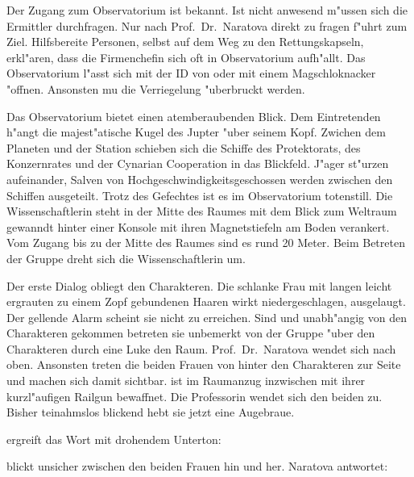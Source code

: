 Der Zugang zum Observatorium ist \ml{} bekannt. Ist \ml{} nicht anwesend m"ussen sich die Ermittler durchfragen. Nur nach Prof.~Dr.~Naratova direkt zu fragen f"uhrt zum Ziel. Hilfsbereite Personen, selbst auf dem Weg zu den Rettungskapseln, erkl"aren, dass die Firmenchefin sich oft in  Observatorium aufh"allt. Das Observatorium l"asst sich mit der ID von \ml{} oder mit einem Magschlo\3knacker "offnen. Ansonsten mu\3 die Verriegelung "uberbruckt werden.

Das Observatorium bietet einen atemberaubenden Blick. Dem Eintretenden h"angt die majest"atische Kugel des Jupter "uber seinem Kopf. Zwichen dem Planeten und der Station schieben sich die Schiffe des Protektorats, des Konzernrates und der Cynarian Cooperation in das Blickfeld. J"ager st"urzen aufeinander, Salven von Hochgeschwindigkeitsgeschossen werden zwischen den Schiffen ausgeteilt. Trotz des Gefechtes ist es im Observatorium totenstill. Die Wissenschaftlerin steht in der Mitte des Raumes mit dem Blick zum Weltraum gewanndt hinter einer Konsole mit ihren Magnetstiefeln am Boden verankert. Vom Zugang bis zu der Mitte des Raumes sind es rund 20 Meter. Beim Betreten der Gruppe dreht sich die Wissenschaftlerin um.


Der erste Dialog obliegt den Charakteren. Die schlanke Frau mit langen leicht ergrauten zu einem Zopf gebundenen Haaren wirkt niedergeschlagen, ausgelaugt. Der gellende Alarm scheint sie nicht zu erreichen. Sind \xl{} und \ml{} unabh"angig von den Charakteren gekommen betreten sie unbemerkt von der Gruppe "uber den Charakteren durch eine Luke den Raum. Prof.~Dr.~Naratova wendet sich nach oben. Ansonsten treten die beiden Frauen von hinter den Charakteren zur Seite und machen sich damit sichtbar. \xl{} ist im Raumanzug inzwischen mit ihrer kurzl"aufigen Railgun bewaffnet. Die Professorin wendet sich den beiden zu. Bisher teinahmslos blickend hebt sie jetzt eine Augebraue.


\xl{} ergreift das Wort mit drohendem Unterton:


\ml{} blickt unsicher zwischen den beiden Frauen hin und her. Naratova antwortet:

